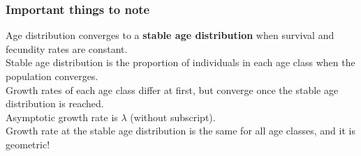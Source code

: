 \documentclass[color=usenames,dvipsnames]{beamer}\usepackage[]{graphicx}\usepackage[]{color}
\begin{document}
\begin{frame}
  \frametitle{Important things to note}
  \large
  Age distribution converges to a {\bf stable age
    distribution} when survival and fecundity rates are constant. \\
  \pause
  \vfill
  Stable age distribution is the proportion of individuals in each age
  class when the population converges. \\
  \pause
  \vfill
  Growth rates of each age class differ at first, but converge
  once the stable age distribution is reached. \\
  \pause
  \vfill
  Asymptotic growth rate is $\lambda$ (without subscript). \\
  \pause
  \vfill
  Growth rate at the stable age distribution is the same for
  all age classes, and it is geometric! \\
\end{frame}







%




\end{document}
